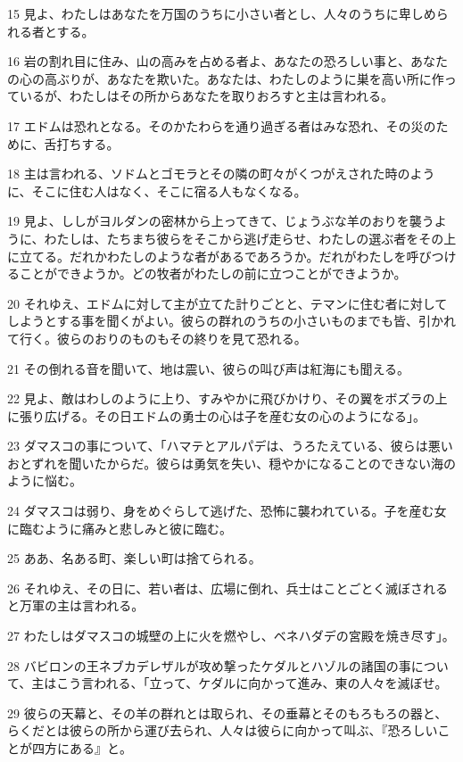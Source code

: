 \par 15 見よ、わたしはあなたを万国のうちに小さい者とし、人々のうちに卑しめられる者とする。
\par 16 岩の割れ目に住み、山の高みを占める者よ、あなたの恐ろしい事と、あなたの心の高ぶりが、あなたを欺いた。あなたは、わたしのように巣を高い所に作っているが、わたしはその所からあなたを取りおろすと主は言われる。
\par 17 エドムは恐れとなる。そのかたわらを通り過ぎる者はみな恐れ、その災のために、舌打ちする。
\par 18 主は言われる、ソドムとゴモラとその隣の町々がくつがえされた時のように、そこに住む人はなく、そこに宿る人もなくなる。
\par 19 見よ、ししがヨルダンの密林から上ってきて、じょうぶな羊のおりを襲うように、わたしは、たちまち彼らをそこから逃げ走らせ、わたしの選ぶ者をその上に立てる。だれかわたしのような者があるであろうか。だれがわたしを呼びつけることができようか。どの牧者がわたしの前に立つことができようか。
\par 20 それゆえ、エドムに対して主が立てた計りごとと、テマンに住む者に対してしようとする事を聞くがよい。彼らの群れのうちの小さいものまでも皆、引かれて行く。彼らのおりのものもその終りを見て恐れる。
\par 21 その倒れる音を聞いて、地は震い、彼らの叫び声は紅海にも聞える。
\par 22 見よ、敵はわしのように上り、すみやかに飛びかけり、その翼をボズラの上に張り広げる。その日エドムの勇士の心は子を産む女の心のようになる」。
\par 23 ダマスコの事について、「ハマテとアルパデは、うろたえている、彼らは悪いおとずれを聞いたからだ。彼らは勇気を失い、穏やかになることのできない海のように悩む。
\par 24 ダマスコは弱り、身をめぐらして逃げた、恐怖に襲われている。子を産む女に臨むように痛みと悲しみと彼に臨む。
\par 25 ああ、名ある町、楽しい町は捨てられる。
\par 26 それゆえ、その日に、若い者は、広場に倒れ、兵士はことごとく滅ぼされると万軍の主は言われる。
\par 27 わたしはダマスコの城壁の上に火を燃やし、ベネハダデの宮殿を焼き尽す」。
\par 28 バビロンの王ネブカデレザルが攻め撃ったケダルとハゾルの諸国の事について、主はこう言われる、「立って、ケダルに向かって進み、東の人々を滅ぼせ。
\par 29 彼らの天幕と、その羊の群れとは取られ、その垂幕とそのもろもろの器と、らくだとは彼らの所から運び去られ、人々は彼らに向かって叫ぶ、『恐ろしいことが四方にある』と。
